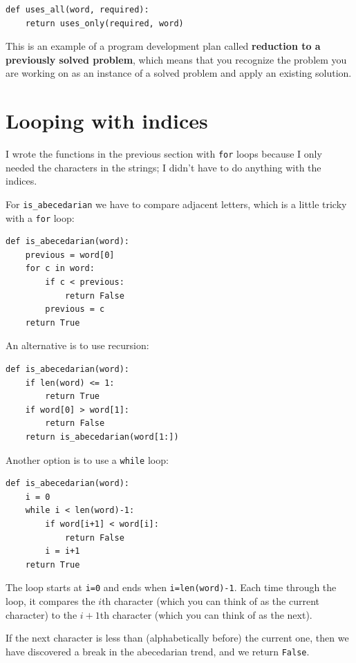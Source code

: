 \documentclass[10pt]{book}
\begin{document}
\begin{verbatim}
def uses_all(word, required):
    return uses_only(required, word)
\end{verbatim}
%
This is an example of a program development plan called {\bf
  reduction to a previously solved problem}, which means that you
recognize the problem you are working on as an instance of a solved
problem and apply an existing solution.   


\section{Looping with indices}

I wrote the functions in the previous section with {\tt for}
loops because I only needed the characters in the strings; I didn't
have to do anything with the indices.

For \verb"is_abecedarian" we have to compare adjacent letters,
which is a little tricky with a {\tt for} loop:

\begin{verbatim}
def is_abecedarian(word):
    previous = word[0]
    for c in word:
        if c < previous:
            return False
        previous = c
    return True
\end{verbatim}

An alternative is to use recursion:

\begin{verbatim}
def is_abecedarian(word):
    if len(word) <= 1:
        return True
    if word[0] > word[1]:
        return False
    return is_abecedarian(word[1:])
\end{verbatim}

Another option is to use a {\tt while} loop:

\begin{verbatim}
def is_abecedarian(word):
    i = 0
    while i < len(word)-1:
        if word[i+1] < word[i]:
            return False
        i = i+1
    return True
\end{verbatim}
%
The loop starts at {\tt i=0} and ends when {\tt i=len(word)-1}.  Each
time through the loop, it compares the $i$th character (which you can
think of as the current character) to the $i+1$th character (which you
can think of as the next).

If the next character is less than (alphabetically before) the current
one, then we have discovered a break in the abecedarian trend, and
we return {\tt False}.
\end{document}

